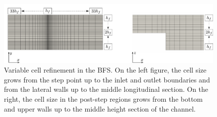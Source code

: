 \documentclass[final,3p,times,11pt,onecolumn]{myElsarticle}
\numberwithin{equation}{section}
\begin{document}
\begin{figure}[t!!!]
\centering
\includegraphics[width=16cm]{fig/Cases/Factores.pdf}
\caption{Variable cell refinement in the BFS.  On the left figure, the cell size grows from the step point up to the inlet and outlet boundaries and from the lateral walls up to the middle longitudinal section. On the right, the cell size in the post-step regions grows from the bottom and upper walls up to the middle height section of the channel.}
\label{Fig:Factores}
\end{figure}
\end{document}
